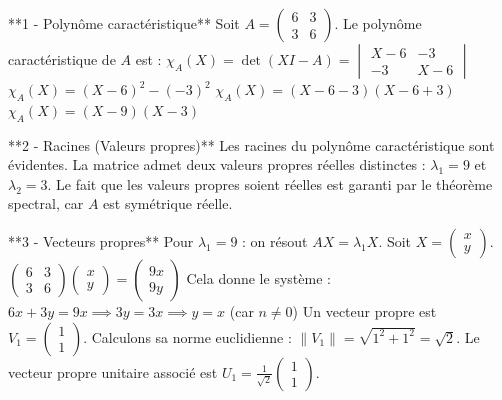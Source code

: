 \documentclass[11pt,a4paper]{article}
\begin{document}
**1 - Polynôme caractéristique**
Soit $A = \begin{pmatrix} 6 & 3 \\ 3 & 6 \end{pmatrix}$.
Le polynôme caractéristique de $A$ est :
$\chi_A(X) = \det(X I - A) = \begin{vmatrix} X - 6 & -3 \\ -3 & X - 6 \end{vmatrix}$
$\chi_A(X) = (X - 6)^2 - (-3)^2$
$\chi_A(X) = (X - 6 - 3)(X - 6 + 3)$
$\chi_A(X) = (X - 9)(X - 3)$

**2 - Racines (Valeurs propres)**
Les racines du polynôme caractéristique sont évidentes. La matrice admet deux valeurs propres réelles distinctes :
$\lambda_1 = 9$ et $\lambda_2 = 3$.
Le fait que les valeurs propres soient réelles est garanti par le théorème spectral, car $A$ est symétrique réelle.

**3 - Vecteurs propres**
Pour $\lambda_1 = 9$ : on résout $AX = \lambda_1 X$.
Soit $X = \begin{pmatrix} x \\ y \end{pmatrix}$.
$\begin{pmatrix} 6 & 3 \\ 3 & 6 \end{pmatrix} \begin{pmatrix} x \\ y \end{pmatrix} = \begin{pmatrix} 9x \\ 9y \end{pmatrix}$
Cela donne le système :
$6x + 3y = 9x \implies 3y = 3x \implies y = x$ (car $n \neq 0$)
Un vecteur propre est $V_1 = \begin{pmatrix} 1 \\ 1 \end{pmatrix}$.
Calculons sa norme euclidienne : $\|V_1\| = \sqrt{1^2 + 1^2} = \sqrt{2}$.
Le vecteur propre unitaire associé est $U_1 = \frac{1}{\sqrt{2}} \begin{pmatrix} 1 \\ 1 \end{pmatrix}$.
\end{document}
